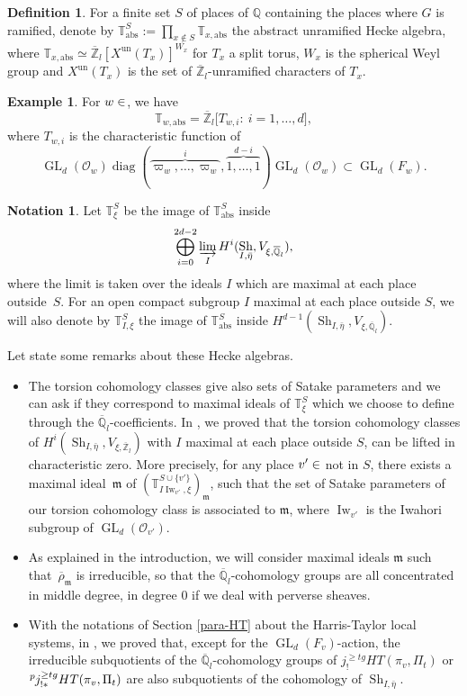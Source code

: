 \documentclass[JEP,XML,SOM,Unicode,published]{cedram}
\newcommand{\NoChangel}[1]{%
\expandafter\let\csname old\string#1\endcsname=#1
\let#1=\relax
\newcommand{#1}{\mathcode`l="716C\csname old\string#1\endcsname\mathcode`l="7160 }%
}
\DeclareMathOperator{\GL}{GL}
\newcommand{\abs}{\mathrm{abs}}
\newcommand{\un}{\mathrm{un}}
\theoremstyle{plain}
\theoremstyle{definition}
\newtheorem{defin}[equation]{Definition}
\newtheorem*{example}{Example}
\newtheorem{nota}[equation]{Notation}
\numberwithin{equation}{subsection}
\newcommand\Tm{{\mathbb T}}
\newcommand\Qm{{\mathbb Q}}
\newcommand\Zm{{\mathbb Z}}
\newcommand\OC{{\mathcal O}}
\newcommand{\lexp}[2]{\kern \scriptspace \vphantom{#2}^{#1}\kern-\scriptspace#2}
\DeclareMathOperator{\sh}{Sh}
\DeclareMathOperator{\Iw}{Iw}
\DeclareMathOperator{\diag}{diag}
\DeclareMathOperator{\spl}{Spl}\NoChangel{\spl}
\begin{document}
\begin{defin}
For a finite set $S$ of places of $\Qm$ containing the places where $G$ is ramified,
denote by $\Tm^S_{\abs}:=\prod_{x \not \in S} \Tm_{x,\abs}$ the
abstract unramified Hecke algebra, where
$\Tm_{x,\abs} \simeq \overline \Zm_l[X^{\un}(T_x)]^{W_x}$ for $T_x$ a split torus,
$W_x$ is the spherical Weyl group and $X^{\un}(T_x)$ is the set of $\overline \Zm_l$-unramified
characters of $T_x$.
\end{defin}

\begin{example}
For $w \in \spl$, we have
\[
\Tm_{w,\abs}=\overline \Zm_l \bigl [T_{w,i}:~ i=1,\dots,d \bigr ],
\]
where $T_{w,i}$ is the characteristic function of
\[
\GL_d(\OC_w) \diag(\overbrace{\varpi_w,\dots,\varpi_w}^{i}, \overbrace{1,\dots,1}^{d-i})
\GL_d(\OC_w) \subset \GL_d(F_w).
\]
\end{example}

\begin{nota}
Let $\Tm^S_\xi$ be the image of $\Tm^S_{\abs}$ inside
\[
\bigoplus_{i =0}^{2d-2}
\varinjlim_{{I}} H^i(\sh_{I,\bar \eta},V_{\xi,\overline \Qm_l}),
\]
where the limit is taken over
the ideals $I$ which are maximal at each place outside~$S$. For an open compact subgroup $I$ maximal at each place outside $S$,
we will also denote by $\Tm^S_{I,\xi}$ the image of $\Tm^S_{\abs}$ inside
$H^{d-1}(\sh_{I,\bar \eta},V_{\xi,\overline \Qm_l})$.
\end{nota}

Let state some remarks about these Hecke algebras.
\begin{itemize}
\item The torsion cohomology classes give also sets of Satake parameters
and we can ask if they correspond to maximal ideals of $\Tm_\xi^S$ which
we choose to define through the $\overline \Qm_l$\nobreakdash-coefficients.
In \cite{boyer-imj}, we proved that the torsion cohomology classes of
$H^i(\sh_{I,\bar \eta},V_{\xi,\overline \Zm_l})$ with
$I$ maximal at each place outside $S$, can be lifted in characteristic zero.
More precisely, for any place $v' \in \spl$ not in $S$, there exists
a maximal ideal~$\mathfrak m$ of
$(\Tm^{S \cup \{v'\} }_{I\Iw_{v'},\xi})_{\mathfrak m}$,
such that the set of Satake parameters of our torsion cohomology class
is associated to $\mathfrak m$, where $\Iw_{v'}$ is the Iwahori subgroup of $\GL_d(\OC_{v'})$.

\item As explained in the introduction, we will consider maximal ideals
$\mathfrak m$ such that~$\overline \rho_{\mathfrak m}$ is irreducible, so that
the $\overline \Qm_l$-cohomology groups are all concentrated in middle degree,
\ie in degree $0$ if we deal with perverse sheaves.

\item With the notations of Section \ref{para-HT} about the Harris-Taylor local systems,
in \cite{boyer-compositio}, we proved that, except for the $\GL_d(F_v)$-action,
the irreducible subquotients of the
$\overline \Qm_l$-cohomology groups of $j^{\geq tg}_! HT(\pi_v,\Pi_t)$ or
$\lexp p j^{\geq tg}_{!*} HT(\pi_v,\Pi_t)$ are also subquotients of
the cohomology of $\sh_{I,\bar \eta}$.
\end{itemize}
\end{document}
